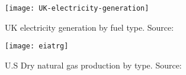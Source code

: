 \begin{figure} [H]
  \begin{center}
    \texttt{[image: UK-electricity-generation]}
    \caption{UK electricity generation by fuel type. Source:\cite{cbuk2016}}
    \label{fig:ukecg}
  \end{center}
\end{figure}

\begin{figure} [H]
  \begin{center}
    \texttt{[image: eiatrg]}
    \caption{U.S Dry natural gas production by type. Source:\cite{eiagov}}
    \label{fig:eiatrgh}
  \end{center}
\end{figure}



